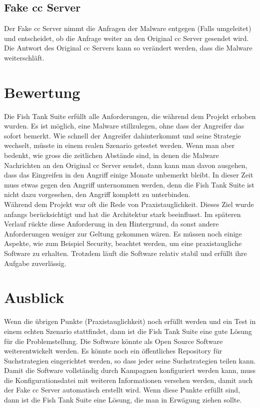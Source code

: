 \subsection{Fake \gls{cc} Server}
Der Fake \gls{cc} Server nimmt die Anfragen der Malware entgegen (Falls umgeleitet) und entscheidet, ob die Anfrage weiter an den Original \gls{cc} Server gesendet wird. Die Antwort des Original \gls{cc} Servers kann so verändert werden, dass die Malware weiterschläft.

\section{Bewertung}
Die Fish Tank Suite erfüllt alle Anforderungen, die während dem Projekt erhoben wurden. Es ist möglich, eine Malware stillzulegen, ohne dass der Angreifer das sofort bemerkt. Wie schnell der Angreifer dahinterkommt und seine Strategie wechselt, müsste in einem realen Szenario getestet werden. Wenn man aber bedenkt, wie gross die zeitlichen Abstände sind, in denen die Malware Nachrichten an den Original \gls{cc} Server sendet, dann kann man davon ausgehen, dass das Eingreifen in den Angriff einige Monate unbemerkt bleibt. In dieser Zeit muss etwas gegen den Angriff unternommen werden, denn die Fish Tank Suite ist nicht dazu vorgesehen, den Angriff komplett zu unterbinden.\\

Während dem Projekt war oft die Rede von Praxistauglichkeit. Dieses Ziel wurde anfangs berücksichtigt und hat die Architektur stark beeinflusst. Im späteren Verlauf rückte diese Anforderung in den Hintergrund, da sonst andere Anforderungen weniger zur Geltung gekommen wären. Es müssen noch einige Aspekte, wie zum Beispiel Security, beachtet werden, um eine praxistaugliche Software zu erhalten. Trotzdem läuft die Software relativ stabil und erfüllt ihre Aufgabe zuverlässig.

\section{Ausblick}
Wenn die übrigen Punkte (Praxistauglichkeit) noch erfüllt werden und ein Test in einem echten Szenario stattfindet, dann ist die Fish Tank Suite eine gute Lösung für die Problemstellung. Die Software könnte als Open Source Software weiterentwickelt werden. Es könnte noch ein öffentliches Repository für Suchstrategien eingerichtet werden, so dass jeder seine Suchstrategien teilen kann. Damit die Software vollständig durch Kampagnen konfiguriert werden kann, muss die Konfigurationsdatei mit weiteren Informationen versehen werden, damit auch der Fake \gls{cc} Server automatisch erstellt wird. Wenn diese Punkte erfüllt sind, dann ist die Fish Tank Suite eine Lösung, die man in Erwägung ziehen sollte.